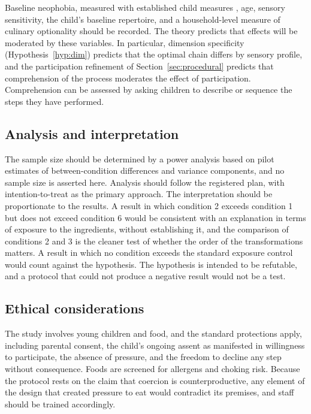 \documentclass[11pt]{article}
\theoremstyle{remark}
\begin{document}
Baseline neophobia, measured with established child measures \citep{pliner1994development}, age, sensory sensitivity, the child's baseline repertoire, and a household-level measure of culinary optionality should be recorded. The theory predicts that effects will be moderated by these variables. In particular, dimension specificity (Hypothesis~\ref{hyp:dim}) predicts that the optimal chain differs by sensory profile, and the participation refinement of Section~\ref{sec:procedural} predicts that comprehension of the process moderates the effect of participation. Comprehension can be assessed by asking children to describe or sequence the steps they have performed.

\subsection{Analysis and interpretation}

The sample size should be determined by a power analysis based on pilot estimates of between-condition differences and variance components, and no sample size is asserted here. Analysis should follow the registered plan, with intention-to-treat as the primary approach. The interpretation should be proportionate to the results. A result in which condition 2 exceeds condition 1 but does not exceed condition 6 would be consistent with an explanation in terms of exposure to the ingredients, without establishing it, and the comparison of conditions 2 and 3 is the cleaner test of whether the order of the transformations matters. A result in which no condition exceeds the standard exposure control would count against the hypothesis. The hypothesis is intended to be refutable, and a protocol that could not produce a negative result would not be a test.

\subsection{Ethical considerations}

The study involves young children and food, and the standard protections apply, including parental consent, the child's ongoing assent as manifested in willingness to participate, the absence of pressure, and the freedom to decline any step without consequence. Foods are screened for allergens and choking risk. Because the protocol rests on the claim that coercion is counterproductive, any element of the design that created pressure to eat would contradict its premises, and staff should be trained accordingly.
\end{document}
